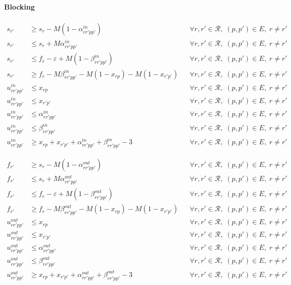\paragraph{Blocking}

\begin{align}
s_{r'} &\ge s_r - M \left( 1 - \alpha^{in}_{rr'pp'} \right)
&& \forall r,r' \in \mathcal{R},\; (p,p') \in E,\; r \neq r' \\
s_{r'} &\le s_r + M \alpha^{in}_{rr'pp'}
&& \forall r,r' \in \mathcal{R},\; (p,p') \in E,\; r \neq r' \\
s_{r'} &\le f_r - \varepsilon + M \left( 1 - \beta^{in}_{rr'pp'} \right)
&& \forall r,r' \in \mathcal{R},\; (p,p') \in E,\; r \neq r' \\
s_{r'} &\ge f_r - M \beta^{in}_{rr'pp'} - M(1-x_{rp}) - M(1-x_{r'p'})
&& \forall r,r' \in \mathcal{R},\; (p,p') \in E,\; r \neq r' \\
u^{in}_{rr'pp'} &\le x_{rp}
&& \forall r,r' \in \mathcal{R},\; (p,p') \in E,\; r \neq r' \\
u^{in}_{rr'pp'} &\le x_{r'p'}
&& \forall r,r' \in \mathcal{R},\; (p,p') \in E,\; r \neq r' \\
u^{in}_{rr'pp'} &\le \alpha^{in}_{rr'pp'}
&& \forall r,r' \in \mathcal{R},\; (p,p') \in E,\; r \neq r' \\
u^{in}_{rr'pp'} &\le \beta^{in}_{rr'pp'}
&& \forall r,r' \in \mathcal{R},\; (p,p') \in E,\; r \neq r' \\
u^{in}_{rr'pp'} &\ge x_{rp} + x_{r'p'} + \alpha^{in}_{rr'pp'} + \beta^{in}_{rr'pp'} - 3
&& \forall r,r' \in \mathcal{R},\; (p,p') \in E,\; r \neq r'
\end{align}

\begin{align}
f_{r'} &\ge s_r - M \left( 1 - \alpha^{out}_{rr'pp'} \right)
&& \forall r,r' \in \mathcal{R},\; (p,p') \in E,\; r \neq r' \\
f_{r'} &\le s_r + M \alpha^{out}_{rr'pp'}
&& \forall r,r' \in \mathcal{R},\; (p,p') \in E,\; r \neq r' \\
f_{r'} &\le f_r - \varepsilon + M \left( 1 - \beta^{out}_{rr'pp'} \right)
&& \forall r,r' \in \mathcal{R},\; (p,p') \in E,\; r \neq r' \\
f_{r'} &\ge f_r - M \beta^{out}_{rr'pp'} - M(1-x_{rp}) - M(1-x_{r'p'})
&& \forall r,r' \in \mathcal{R},\; (p,p') \in E,\; r \neq r' \\
u^{out}_{rr'pp'} &\le x_{rp}
&& \forall r,r' \in \mathcal{R},\; (p,p') \in E,\; r \neq r' \\
u^{out}_{rr'pp'} &\le x_{r'p'}
&& \forall r,r' \in \mathcal{R},\; (p,p') \in E,\; r \neq r' \\
u^{out}_{rr'pp'} &\le \alpha^{out}_{rr'pp'}
&& \forall r,r' \in \mathcal{R},\; (p,p') \in E,\; r \neq r' \\
u^{out}_{rr'pp'} &\le \beta^{out}_{rr'pp'}
&& \forall r,r' \in \mathcal{R},\; (p,p') \in E,\; r \neq r' \\
u^{out}_{rr'pp'} &\ge x_{rp} + x_{r'p'} + \alpha^{out}_{rr'pp'} + \beta^{out}_{rr'pp'} - 3
&& \forall r,r' \in \mathcal{R},\; (p,p') \in E,\; r \neq r'
\end{align}

